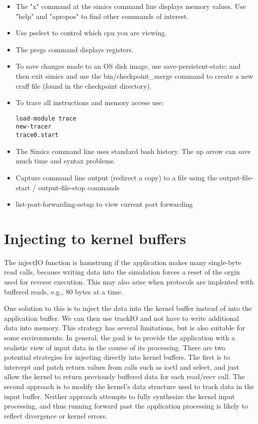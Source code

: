 \documentclass[titlepage]{article}
\begin{document}
\begin{appendices}
\begin{itemize}
\item The "x" command at the simics command line displays memory values.  Use "help" and "apropos" to find other commands of interest.

\item Use pselect to control which cpu you are viewing.

\item The pregs command displays registers.  

\item To save changes made to an OS disk image, use save-persistent-state; and then exit simics and use the bin/checkpoint\_merge command
to create a new craff file (found in the checkpoint directory).

\item To trace all instructions and memory access use:
\begin{verbatim}
load-module trace
new-tracer
trace0.start
\end{verbatim}

\item The Simics command line uses standard bash history.  The up arrow can save much time and syntax problems.

\item Capture command line output (redirect a copy) to a file using the output-file-start / output-file-stop commands

\item {list-port-forwarding-setup} to view current port forwarding
\end{itemize}

\section{Injecting to kernel buffers}
The injectIO function is hamstrung if the application makes many single-byte read calls, because writing data into the
simulation forces a reset of the orgin used for reverse execution.  This may also arise when protocols are implented
with buffered reads, e.g., 80 bytes at a time.

One solution to this is to inject the data into the kernel buffer instead of into the application buffer.
We can then use trackIO and not have to write additional data into memory.  This strategy has several limitations, but
is also suitable for some environments.  In general, the goal is to provide the application with a realistic view of
input data in the course of its processing.  There are two potential strategies for injecting directly into kernel buffers.
The first is to intercept and patch return values from calls such as ioctl and select, and just allow the kernel to 
return previously buffered data for each read/recv call.  The second approach is to modify the kernel's data structure
used to track data in the input buffer.  Neither approach attempts to fully synthesize the kernel input processing, and thus
running forward past the application processing is likely to reflect divergence or kernel errors.


\end{appendices}
\end{document}
